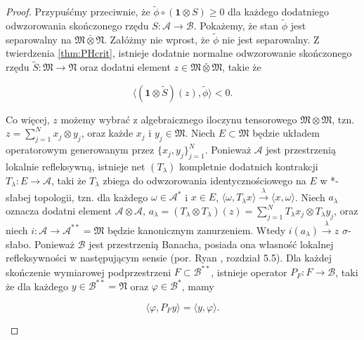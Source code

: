 \begin{proof}
Przypuśćmy przeciwnie, że $\tilde{\phi} \circ (\mathbf{1} \otimes S) \geq 0$
dla każdego dodatniego odwzorowania skończonego rzędu
$S: \mathcal{A} \rightarrow \mathcal{B}$.
Pokażemy, że stan $\tilde{\phi}$
jest separowalny na $\mathfrak{M} \bar{\otimes} \mathfrak{N}$.
Załóżmy nie wprost, że $\tilde{\phi}$ nie jest separowalny.
Z twierdzenia \ref{thm:PHcrit},
istnieje dodatnie normalne odwzorowanie skończonego rzędu
$\tilde{S}: \mathfrak{M} \rightarrow \mathfrak{N}$
oraz dodatni element $z \in \mathfrak{M} \bar{\otimes} \mathfrak{M}$,
takie że
\begin{linenomath*}
 \begin{equation}
\label{eq:Random6347}
\langle(\mathbf{1} \otimes \tilde{S})(z), \tilde{\phi}\rangle < 0.
 \end{equation}
\end{linenomath*}
Co więcej, $z$ możemy wybrać z algebraicznego iloczynu tensorowego
$\mathfrak{M} \otimes \mathfrak{M}$,
tzn. $z = \sum_{j=1}^{N} x_{j} \otimes y_{j}$,
oraz każde $x_{j}$ i $y_{j} \in \mathfrak{M}$.
Niech $E \subset \mathfrak{M}$ będzie układem operatorowym generowanym przez
$\{ x_{j}, y_{j}\}_{j=1}^{N}$.
Ponieważ $\mathcal{A}$ jest przestrzenią lokalnie refleksywną,
istnieje net $(T_{\lambda})$ kompletnie dodatnich kontrakcji
$T_{\lambda}: E \rightarrow \mathcal{A}$,
taki że $T_{\lambda}$ zbiega do odwzorowania identycznościowego na $E$
w *-słabej topologii, tzn.
dla każdego $\omega \in \mathcal{A}^{*}$ i $x \in E$,
$ \langle \omega, T_{\lambda}x \rangle\stackrel{\lambda}{\rightarrow}
\langle x, \omega \rangle$.
Niech $a_{\lambda}$ oznacza dodatni element $\mathcal{A} \otimes \mathcal{A}$,
$a_{\lambda} = (T_{\lambda} \otimes T_{\lambda}) (z) =
\sum_{j=1}^{N} T_{\lambda} x_{j} \otimes T_{\lambda} y_{j}$,
oraz niech
$i: \mathcal{A} \rightarrow \mathcal{A}^{**}=\mathfrak{M}$
będzie kanonicznym zanurzeniem.
Wtedy $i(a_{\lambda}) \stackrel{\lambda}{\rightarrow} z$
$\sigma$-słabo.
Ponieważ $\mathcal{B}$ jest przestrzenią Banacha,
posiada ona własność lokalnej refleksywności w następującym sensie
(por. Ryan \cite{Ryan2002}, rozdział 5.5).
Dla każdej skończenie wymiarowej podprzestrzeni $F \subset \mathcal{B}^{**}$,
istnieje operator $P_{F}: F \rightarrow \mathcal{B}$,
taki że dla każdego $y \in \mathcal{B}^{**} = \mathfrak{N}$
oraz $\varphi \in \mathcal{B}^{*}$, mamy
\begin{linenomath*}
 \begin{equation}
\label{eq:Random24093}
\langle \varphi, P_{F}y \rangle =\langle y, \varphi \rangle.
 \end{equation}

\end{linenomath*}
\end{proof}
